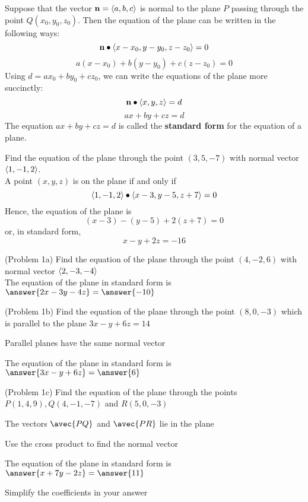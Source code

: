 \documentclass[handout]{ximera}
\begin{document}
\begin{proposition}
Suppose that the vector $\mathbf{n} = \left\langle a,b,c\right\rangle$ is normal to the plane $P$ passing through the point $Q(x_0, y_0, z_0)$.
Then the equation of the plane can be written in the following ways:
\[
\vec{n} \dotp \vector{x-x_0, y-y_0, z-z_0} = 0 %
\]
\[
a(x-x_0) + b(y-y_0) + c(z-z_0) = 0 %
\]
Using $d = ax_0 + by_0 + cz_0$,  we can write the equations of the plane more succinctly:
\[
\vec{n} \dotp \vector{x, y, z} = d %
\]
\[
ax+by+cz = d 
\]
The equation $ax+by+cz =d$ is called the \textbf{standard form} for the equation of a plane.
\end{proposition}

\begin{example}[Example 1] 
Find the equation of the plane through the point $(3, 5, -7)$ with normal vector $\left\langle 1, -1, 2\right\rangle$.\\
A point $(x, y, z)$ is on the plane if and only if 
\[
\left\langle 1, -1, 2\right\rangle \bullet \left\langle x - 3, y-5, z+7\right\rangle =0
\]
Hence, the equation of the plane is
\[
(x-3) - (y-5) + 2(z+7) = 0
\]
or, in standard form,
\[
x - y + 2z = -16
\]
\end{example}

\begin{problem}(Problem 1a)
Find the equation of the plane through the point $(4, -2, 6)$ with normal vector $\left\langle 2, -3, -4\right\rangle$\\
The equation of the plane in standard form is $\answer{2x-3y-4z} = \answer{-10}$
\end{problem}

\begin{problem}(Problem 1b)
Find the equation of the plane through the point $(8, 0, -3)$ which is parallel to the plane $3x - y + 6z = 14$\\
\begin{hint}
Parallel planes have the same normal vector
\end{hint}
The equation of the plane in standard form is $\answer{3x-y+6z} = \answer{6}$
\end{problem}

\begin{problem}(Problem 1c)
Find the equation of the plane through the points $P(1, 4, 9), Q(4, -1, -7)$ and $R(5, 0, -3)$\\
\begin{hint}
The vectors $\avec{PQ}$ and $\avec{PR}$ lie in the plane
\end{hint}
\begin{hint}
Use the cross product to find the normal vector
\end{hint}
The equation of the plane in standard form is $\answer{x+7y-2z} = \answer{11}$
\begin{hint}
Simplify the coefficients in your answer
\end{hint}
\end{problem}
\end{document}
